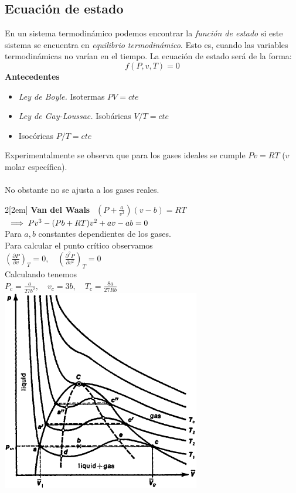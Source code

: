 \documentclass{myclass}
\begin{document}
\subsection{Ecuación de estado}
En un sistema termodinámico podemos encontrar la \textit{función de estado} si este sistema se encuentra en \textit{equilibrio termodinámico}. Esto es, cuando las variables termodinámicas no varían en el tiempo. La ecuación de estado será de la forma:
$$
\boxed{f(P, v, T) = 0} 
$$
\textbf{Antecedentes}
\begin{itemize}
    \item \textit{Ley de Boyle.} Isotermas $PV=cte$
    \item \textit{Ley de Gay-Loussac.} Isobáricas $V/T=cte$
    \item Isocóricas $P/T=cte$
\end{itemize}
Experimentalmente se observa que para los gases ideales se cumple $\boxed{Pv=RT}$ ($v$ molar específica). \\
\\
No obstante no se ajusta a los gases reales. 
\begin{multicols}{2}[\columnsep2em]
\noindent
\textbf{Van del Waals} $ \ \
\boxed{(P+\frac{a}{v^2})(v-b) = RT}$ \\
$
\\
\implies Pv^3 - (Pb + RT)v^2 + av - ab = 0
$\\
Para $a, b$ constantes dependientes de los gases. \\
Para calcular el punto crítico observamos \\ $\left(\frac{\partial P}{\partial v}\right)_T = 0, \quad \left(\frac{\partial^2 P}{\partial v^2}\right)_T = 0$ \\
Calculando tenemos \\
$P_c = \frac{a}{27b^2}, \quad v_c = 3b, \quad T_c = \frac{8a}{27Rb} \ \ \ \ \ \ \ \ \ \ \ \ \ $ 
\columnbreak
    \includegraphics[scale=0.4]{images/van-der-waals.png}
\end{multicols}
\end{document}
